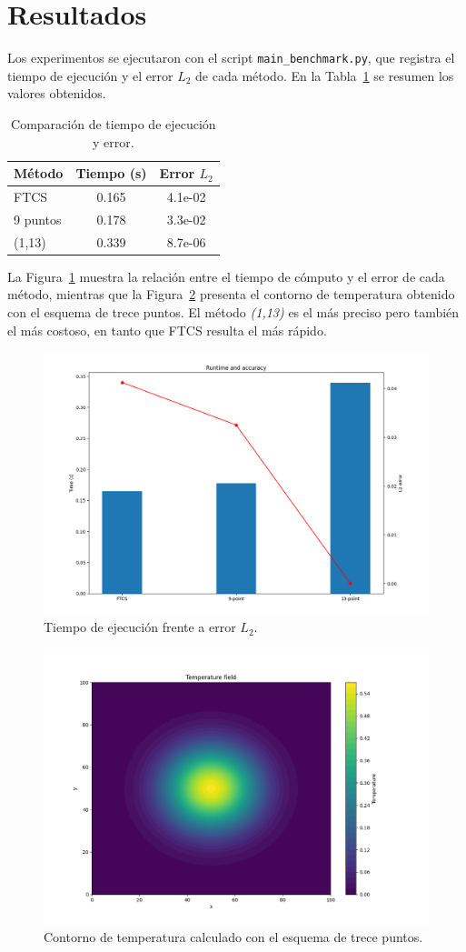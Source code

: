\section{Resultados}
Los experimentos se ejecutaron con el script \texttt{main\_benchmark.py}, que registra el tiempo de ejecuci\'on y el error $L_2$ de cada m\'etodo. En la Tabla~\ref{tab:benchmark} se resumen los valores obtenidos.

\begin{table}[h]
\centering
\begin{tabular}{lcc}
\hline
M\'etodo & Tiempo (s) & Error $L_2$\\
\hline
FTCS & 0.165 & 4.1e-02\\
9 puntos & 0.178 & 3.3e-02\\
(1,13) & 0.339 & 8.7e-06\\
\hline
\end{tabular}
\caption{Comparaci\'on de tiempo de ejecuci\'on y error.}
\label{tab:benchmark}
\end{table}

La Figura~\ref{fig:time-error} muestra la relaci\'on entre el tiempo de c\'omputo y el error de cada m\'etodo, mientras que la Figura~\ref{fig:contour} presenta el contorno de temperatura obtenido con el esquema de trece puntos. El m\'etodo \emph{(1,13)} es el m\'as preciso pero tambi\'en el m\'as costoso, en tanto que FTCS resulta el m\'as r\'apido.

\begin{figure}[h]
\centering
\includegraphics[width=0.7\linewidth]{resultados/Figure_1.png}
\caption{Tiempo de ejecuci\'on frente a error $L_2$.}
\label{fig:time-error}
\end{figure}

\begin{figure}[h]
\centering
\includegraphics[width=0.7\linewidth]{resultados/Figure_2.png}
\caption{Contorno de temperatura calculado con el esquema de trece puntos.}
\label{fig:contour}
\end{figure}
